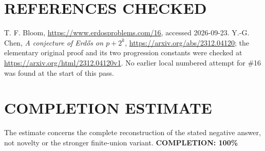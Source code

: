 \section{REFERENCES CHECKED}
T. F. Bloom, \url{https://www.erdosproblems.com/16}, accessed 2026-09-23. Y.-G. Chen, \emph{A conjecture of Erd\H{o}s on $p+2^k$}, \url{https://arxiv.org/abs/2312.04120}; the elementary original proof and its two progression constants were checked at \url{https://arxiv.org/html/2312.04120v1}. No earlier local numbered attempt for \#16 was found at the start of this pass.

\section{COMPLETION ESTIMATE}
The estimate concerns the complete reconstruction of the stated negative answer, not novelty or the stronger finite-union variant.
\textbf{COMPLETION: 100\%}

